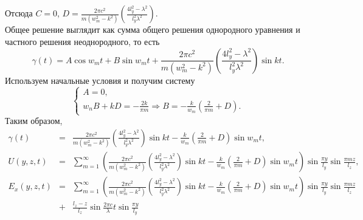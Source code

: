 Отсюда $C = 0$, $D = \frac{2\pi c^2}{m(w_m^2 - k^2)}\left(\frac{4l_y^2 - \lambda^2}{l_y^2\lambda^2} \right)$.\\
Общее решение выглядит как сумма общего решения однородного уравнения и частного решения неоднородного, то есть
\[
\gamma(t) = A\cos{w_mt} + B\sin{w_mt} + \frac{2\pi c^2}{m(w_m^2 - k^2)}\left(\frac{4l_y^2 - \lambda^2}{l_y^2\lambda^2} \right)\sin{kt}.
\]
Используем начальные условия и получим систему
\[
\left\{
  \begin{array}{l}
    A = 0,\\
    w_nB + kD = -\frac{2k}{\pi m} \Rightarrow B = -\frac{k}{w_m}\left(\frac{2}{\pi m} + D \right).
  \end{array}
\right.
\]
Таким образом,
\begin{eqnarray*}
  \gamma(t) &=& \frac{2\pi c^2}{m(w_m^2 - k^2)}\left(\frac{4l_y^2 - \lambda^2}{l_y^2\lambda^2} \right)\sin{kt} - \frac{k}{w_m}\left(\frac{2}{\pi m} + D\right)\sin{w_mt},\\
  U(y, z, t) &=& \displaystyle \sum_{m=1}^{\infty} \left( \frac{2\pi c^2}{m(w_m^2 - k^2)}\left(\frac{4l_y^2 - \lambda^2}{l_y^2\lambda^2} \right)\sin{kt} - \frac{k}{w_m}\left(\frac{2}{\pi m} + D\right)\sin{w_mt} \right) \sin\frac{\pi y}{l_y} \sin\frac{\pi m z}{l_z},\\
  E_x(y, z, t) &=& \displaystyle
    \sum_{m=1}^{\infty} \left( \frac{2\pi c^2}{m(w_m^2 - k^2)}\left(\frac{4l_y^2 - \lambda^2}{l_y^2\lambda^2} \right)\sin{kt} - \frac{k}{w_m}\left(\frac{2}{\pi m} + D\right)\sin{w_mt} \right) \sin\frac{\pi y}{l_y} \sin\frac{\pi m z}{l_z}\\
    &+& \frac{l_z - z}{l_z} \sin\frac{2\pi c}{\lambda}t \sin\frac{\pi y}{l_y}
\end{eqnarray*}
